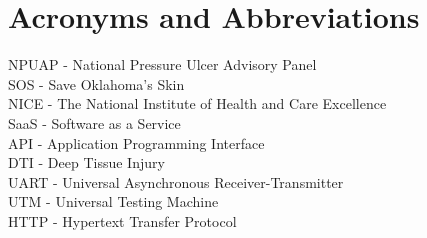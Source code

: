\chapter*{Acronyms and Abbreviations}

\vspace{5mm}

NPUAP - National Pressure Ulcer Advisory Panel\\
SOS - Save Oklahoma's Skin\\
NICE - The National Institute of Health and Care Excellence\\
SaaS - Software as a Service\\
API - Application Programming Interface\\
DTI - Deep Tissue Injury\\
UART - Universal Asynchronous Receiver-Transmitter\\
UTM - Universal Testing Machine\\
HTTP - Hypertext Transfer Protocol





